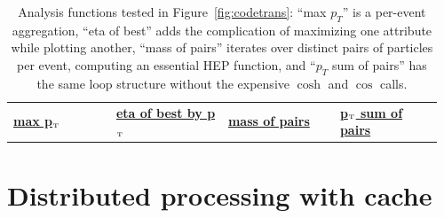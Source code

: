 \documentclass[a4paper]{jpconf}
\begin{document}
\begin{table}
\caption{\label{tab:code} Analysis functions tested in Figure~\ref{fig:codetrans}: ``max $p_T$'' is a per-event aggregation, ``eta of best'' adds the complication of maximizing one attribute while plotting another, ``mass of pairs'' iterates over distinct pairs of particles per event, computing an essential HEP function, and ``$p_T$ sum of pairs'' has the same loop structure without the expensive $\cosh$ and $\cos$ calls.}

\begin{center}
\begin{tabular}{p{0.23\linewidth} p{0.25\linewidth} p{0.25\linewidth} p{0.23\linewidth}}
\underline{{\small\bf max p$_{\mbox{\tiny T}}$}}
{\scriptsize } &
\underline{{\small\bf eta of best by p$_{\mbox{\tiny T}}$}}
{\scriptsize } &
\underline{{\small\bf mass of pairs}}
{\scriptsize } &
\underline{{\small\bf p$_{\mbox{\tiny T}}$ sum of pairs}}
{\scriptsize }
\end{tabular}
\end{center}
\vspace{-0.5 cm}
\end{table}

\section{Distributed processing with cache}
\end{document}
